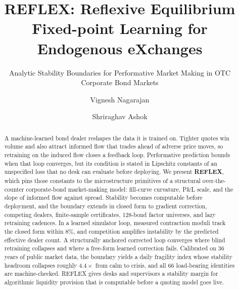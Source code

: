 \documentclass[sigconf]{acmart}
\begin{document}
\title[REFLEX: Analytic Stability Boundaries for Performative Market Making]%
{REFLEX: Reflexive Equilibrium Fixed-point Learning for Endogenous
eXchanges}
\subtitle{Analytic Stability Boundaries for Performative Market Making in
OTC Corporate Bond Markets}

\author{Vignesh Nagarajan}

\author{Shriraghav Ashok}
\authornotemark[2]

\begin{abstract}
A machine-learned bond dealer reshapes the data it is trained on. Tighter
quotes win volume and also attract informed flow that trades ahead of
adverse price moves, so retraining on the induced flow closes a feedback
loop. Performative prediction bounds when that loop converges, but its
condition is stated in Lipschitz constants of an unspecified loss that no
desk can evaluate before deploying. We present \textbf{REFLEX}, which pins
those constants to the microstructure primitives of a structural
over-the-counter corporate-bond market-making model: fill-curve curvature,
P\&L scale, and the slope of informed flow against spread. Stability becomes
computable before deployment, and the boundary extends in closed form to
gradient correction, competing dealers, finite-sample certificates,
128-bond factor universes, and lazy retraining cadences. In a learned
simulator loop, measured contraction moduli track the closed form within
$8\%$, and competition amplifies instability by the predicted effective
dealer count. A structurally anchored corrected loop converges where blind
retraining collapses and where a free-form learned correction fails.
Calibrated on 36 years of public market data, the boundary yields a daily
fragility index whose stability headroom collapses roughly $4.4\times$ from
calm to crisis, and all 66 load-bearing identities are machine-checked.
REFLEX gives desks and supervisors a stability margin for algorithmic
liquidity provision that is computable before a quoting model goes live.
\end{abstract}
\end{document}
